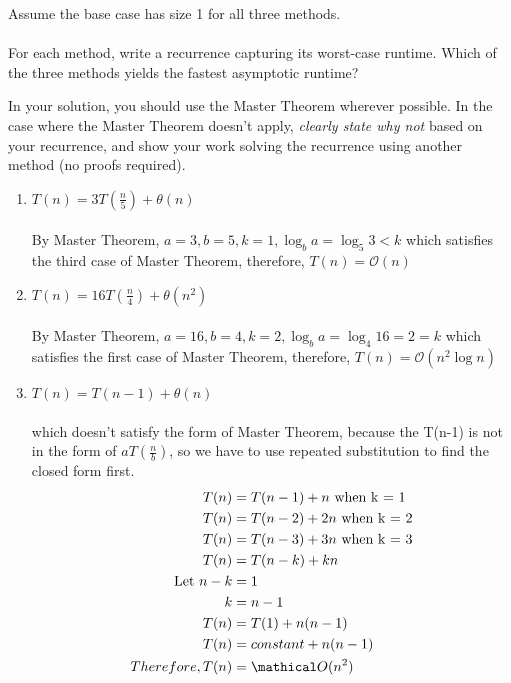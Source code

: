 \documentclass[12pt]{article}
\begin{document}
Assume the base case has size 1 for all three methods.\\ \\
For each method, write a recurrence capturing its worst-case runtime.
Which of the three methods yields the fastest asymptotic runtime? 

In your solution, you should use the Master Theorem wherever possible. In the case where the Master Theorem doesn't apply, \emph{clearly state why not} based on your recurrence, and show your work solving the recurrence using another method (no proofs required).


\begin{enumerate}
\item
$T(n) = 3T(\frac{n}{5}) + \theta(n)$\\\\
By Master Theorem, $a=3, b=5, k=1, \log_b a = \log_5 3 < k$ which satisfies the third case of Master Theorem, therefore, $T(n) = \mathcal O(n)$
\item
$T(n) = 16T(\frac{n}{4}) + \theta(n^2)$\\\\
By Master Theorem, $a=16, b=4, k=2, \log_b a = \log_4 16 =2 = k$ which satisfies the first case of Master Theorem, therefore, $T(n) = \mathcal O(n^2\log n)$
\item
$T(n) = T(n-1) + \theta(n)$\\\\
which doesn't satisfy the form of Master Theorem, because the T(n-1) is not in the form of $aT(\frac{n}{b})$, so we have to use repeated substitution to find the closed form first.
\newpage
\begin{align*}
T(n) &= T(n-1) + n\ \text{when k = 1}\\
T(n) &= T(n-2) + 2n\ \text{when k = 2}\\
T(n) &= T(n-3) + 3n\ \text{when k = 3}\\
T(n) &= T(n-k) + kn\\
\text{Let}\ n-k &= 1\\
k &= n-1\\
T(n) &= T(1) + n(n-1)\\
T(n) &= constant + n(n-1)\\
Therefore, T(n) &= \mathical O (n^2)
\end{align*}
\end{enumerate}
\end{document}
